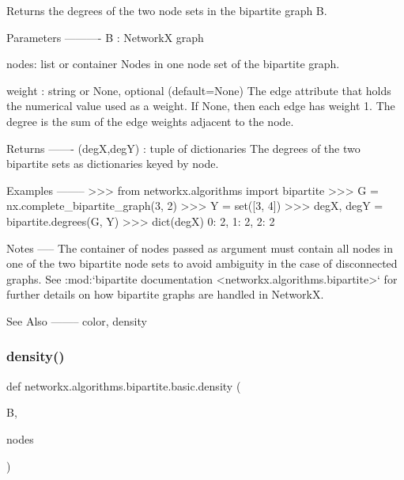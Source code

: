 \begin{DoxyVerb}Returns the degrees of the two node sets in the bipartite graph B.

Parameters
----------
B : NetworkX graph

nodes: list or container
  Nodes in one node set of the bipartite graph.

weight : string or None, optional (default=None)
   The edge attribute that holds the numerical value used as a weight.
   If None, then each edge has weight 1.
   The degree is the sum of the edge weights adjacent to the node.

Returns
-------
(degX,degY) : tuple of dictionaries
   The degrees of the two bipartite sets as dictionaries keyed by node.

Examples
--------
>>> from networkx.algorithms import bipartite
>>> G = nx.complete_bipartite_graph(3, 2)
>>> Y = set([3, 4])
>>> degX, degY = bipartite.degrees(G, Y)
>>> dict(degX)
{0: 2, 1: 2, 2: 2}

Notes
-----
The container of nodes passed as argument must contain all nodes
in one of the two bipartite node sets to avoid ambiguity in the
case of disconnected graphs.
See :mod:`bipartite documentation <networkx.algorithms.bipartite>`
for further details on how bipartite graphs are handled in NetworkX.

See Also
--------
color, density
\end{DoxyVerb}
 \mbox{\label{namespacenetworkx_1_1algorithms_1_1bipartite_1_1basic_a6f01281cb4f0d12041cfef9cbfc4bbb4}} 
\subsubsection{\texorpdfstring{density()}{density()}}
{\footnotesize\ttfamily def networkx.\+algorithms.\+bipartite.\+basic.\+density (\begin{DoxyParamCaption}\item[{}]{B,  }\item[{}]{nodes }\end{DoxyParamCaption})}

